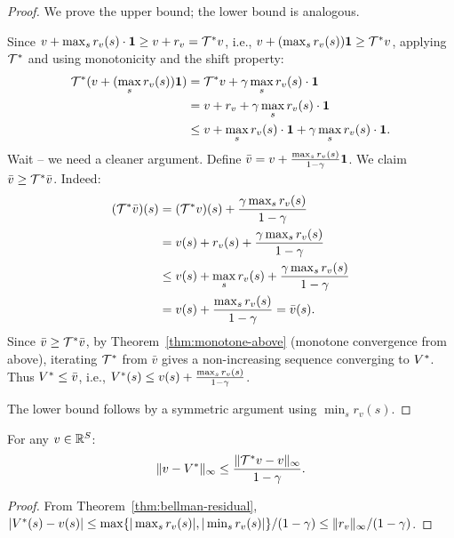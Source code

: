 \documentclass[11pt,a4paper]{article}
\begin{document}
\begin{proof}
We prove the upper bound; the lower bound is analogous.

Since $v + \max_s r_v(s) \cdot \mathbf{1} \geq v + r_v =
\mathcal{T}^* v$, i.e.,
$v + (\max_s r_v(s)) \mathbf{1} \geq \mathcal{T}^* v$, applying
$\mathcal{T}^*$ and using monotonicity and the shift property:
\begin{align*}
    \mathcal{T}^*(v + (\max_s r_v(s))\mathbf{1})
    &= \mathcal{T}^* v + \gamma \max_s r_v(s) \cdot \mathbf{1} \\
    &= v + r_v + \gamma \max_s r_v(s) \cdot \mathbf{1} \\
    &\leq v + \max_s r_v(s) \cdot \mathbf{1}
    + \gamma \max_s r_v(s) \cdot \mathbf{1}.
\end{align*}
Wait -- we need a cleaner argument. Define $\bar{v} = v +
\frac{\max_s r_v(s)}{1-\gamma} \mathbf{1}$. We claim
$\bar{v} \geq \mathcal{T}^* \bar{v}$. Indeed:
\begin{align*}
    (\mathcal{T}^* \bar{v})(s)
    &= (\mathcal{T}^* v)(s) +
    \frac{\gamma \max_s r_v(s)}{1-\gamma} \\
    &= v(s) + r_v(s) +
    \frac{\gamma \max_s r_v(s)}{1-\gamma} \\
    &\leq v(s) + \max_s r_v(s) +
    \frac{\gamma \max_s r_v(s)}{1-\gamma} \\
    &= v(s) + \frac{\max_s r_v(s)}{1-\gamma}
    = \bar{v}(s).
\end{align*}
Since $\bar{v} \geq \mathcal{T}^* \bar{v}$, by
Theorem~\ref{thm:monotone-above} (monotone convergence from above),
iterating $\mathcal{T}^*$ from $\bar{v}$ gives a non-increasing
sequence converging to $V^*$. Thus $V^* \leq \bar{v}$, i.e.,
$V^*(s) \leq v(s) + \frac{\max_s r_v(s)}{1-\gamma}$.

The lower bound follows by a symmetric argument using $\min_s r_v(s)$.
\end{proof}

\begin{corollary}
\label{cor:two-sided}
For any $v \in \mathbb{R}^S$:
\[
    \|v - V^*\|_\infty \leq
    \frac{\|\mathcal{T}^* v - v\|_\infty}{1-\gamma}.
\]
\end{corollary}

\begin{proof}
From Theorem~\ref{thm:bellman-residual},
$|V^*(s) - v(s)| \leq \max\{|\max_s r_v(s)|,
|\min_s r_v(s)|\}/(1-\gamma)
\leq \|r_v\|_\infty/(1-\gamma)$.
\end{proof}
\end{document}
